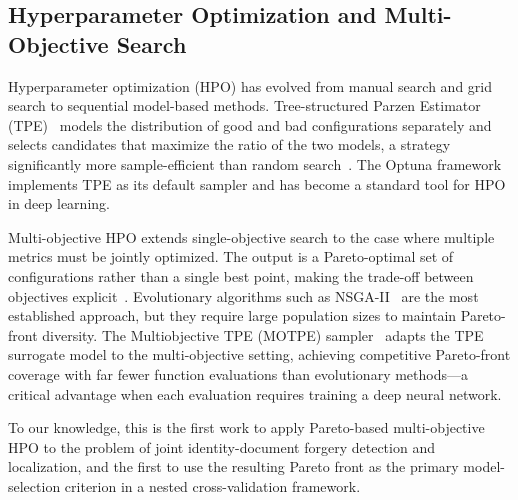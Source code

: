 \subsection{Hyperparameter Optimization and Multi-Objective Search}

Hyperparameter optimization (HPO) has evolved from manual search and grid search to
sequential model-based methods. Tree-structured Parzen Estimator
(TPE)~\cite{tpe2011} models the distribution of good and bad configurations
separately and selects candidates that maximize the ratio of the two models, a
strategy significantly more sample-efficient than random search~\cite{randomsearch2012}.
The Optuna framework~\cite{optuna2019} implements TPE as its default sampler and
has become a standard tool for HPO in deep learning.

Multi-objective HPO extends single-objective search to the case where multiple
metrics must be jointly optimized. The output is a Pareto-optimal set of
configurations rather than a single best point, making the trade-off between
objectives explicit~\cite{miettinen1999nonlinear}. Evolutionary algorithms such as
NSGA-II~\cite{nsga2_2002} are the most established approach, but they require
large population sizes to maintain Pareto-front diversity. The Multiobjective TPE
(MOTPE) sampler~\cite{motpe2022} adapts the TPE surrogate model to the
multi-objective setting, achieving competitive Pareto-front coverage with far fewer
function evaluations than evolutionary methods—a critical advantage when each
evaluation requires training a deep neural network.

To our knowledge, this is the first work to apply Pareto-based multi-objective HPO
to the problem of joint identity-document forgery detection and localization, and
the first to use the resulting Pareto front as the primary model-selection criterion
in a nested cross-validation framework.
